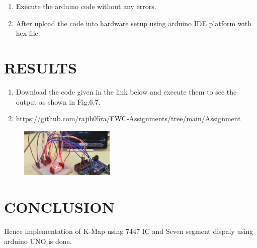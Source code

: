 \documentclass[conference]{IEEEtran}
\begin{document}
\begin{enumerate}
\item Execute the arduino code without any errors.
\item After upload the code into hardware setup using arduino IDE platform with hex file.
 \end{enumerate}
\newpage
\section{RESULTS}
 \begin{enumerate}
	 \item Download the code given in the link below and execute them to see the output as shown in Fig.6,7. 
	 \item https://github.com/rajib05ra/FWC-Assignments/tree/main/Assignment%
 \end{enumerate}


\begin{figure}[h]                           
\centering                                 
\includegraphics[width=0.4\textwidth]{fig5.jpg   }                                           
\caption{\label{fig-5:Gates}}               
\end{figure}

\section{CONCLUSION}
 Hence implementation of K-Map using 7447 IC and Seven segment dispaly using arduino UNO is done.
\end{document}
